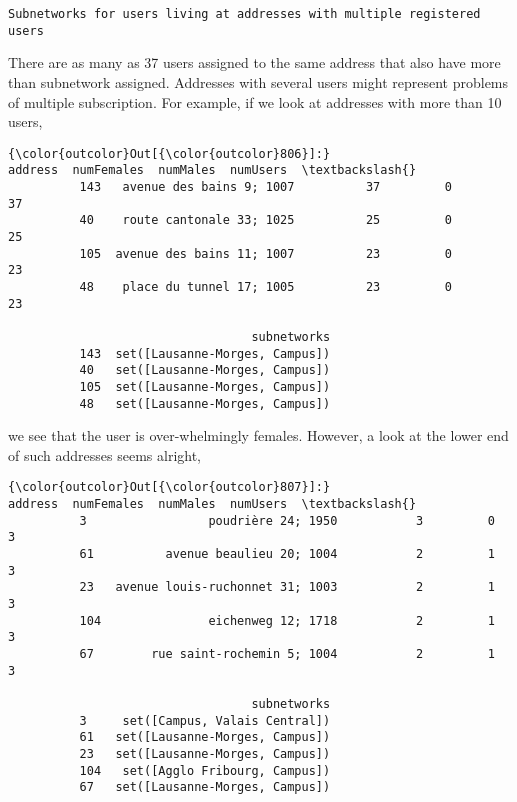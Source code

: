 \documentclass{report}
\begin{document}
    \begin{Verbatim}[commandchars=\\\{\}]
Subnetworks for users living at addresses with multiple registered users
    \end{Verbatim}

    There are as many as 37 users assigned to the same address that also
have more than subnetwork assigned. Addresses with several users might
represent problems of multiple subscription. For example, if we look at
addresses with more than 10 users,


            \begin{Verbatim}[commandchars=\\\{\}]
{\color{outcolor}Out[{\color{outcolor}806}]:}                        address  numFemales  numMales  numUsers  \textbackslash{}
          143   avenue des bains 9; 1007          37         0        37   
          40    route cantonale 33; 1025          25         0        25   
          105  avenue des bains 11; 1007          23         0        23   
          48    place du tunnel 17; 1005          23         0        23   
          
                                  subnetworks  
          143  set([Lausanne-Morges, Campus])  
          40   set([Lausanne-Morges, Campus])  
          105  set([Lausanne-Morges, Campus])  
          48   set([Lausanne-Morges, Campus])  
\end{Verbatim}
        
    we see that the user is over-whelmingly females. However, a look at the
lower end of such addresses seems alright,


            \begin{Verbatim}[commandchars=\\\{\}]
{\color{outcolor}Out[{\color{outcolor}807}]:}                              address  numFemales  numMales  numUsers  \textbackslash{}
          3                 poudrière 24; 1950           3         0         3   
          61          avenue beaulieu 20; 1004           2         1         3   
          23   avenue louis-ruchonnet 31; 1003           2         1         3   
          104               eichenweg 12; 1718           2         1         3   
          67        rue saint-rochemin 5; 1004           2         1         3   
          
                                  subnetworks  
          3     set([Campus, Valais Central])  
          61   set([Lausanne-Morges, Campus])  
          23   set([Lausanne-Morges, Campus])  
          104   set([Agglo Fribourg, Campus])  
          67   set([Lausanne-Morges, Campus])  
\end{Verbatim}
        
\end{document}
